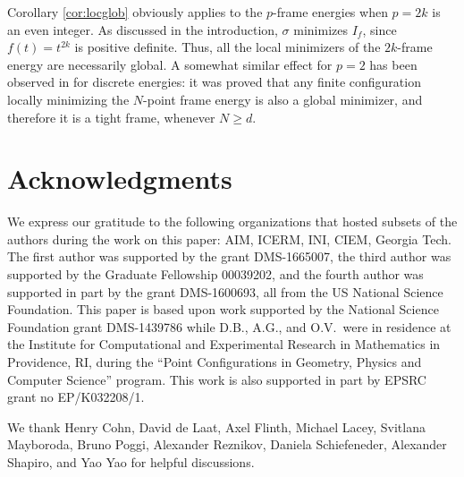 \documentclass[11pt, leqno]{amsart}
\theoremstyle{definition}
\numberwithin{equation}{section}
\begin{document}
Corollary \ref{cor:locglob} obviously applies to the $p$-frame energies  when $p= 2k$ is an even integer.    As discussed in the introduction,  $\sigma$  minimizes $I_f$, since $f(t) = t^{2k}$ is positive definite. Thus, all the local minimizers of the $2k$-frame energy are necessarily global. A somewhat  similar effect for $p=2$  has been observed  in \cite{benedetto2003finite} for discrete energies: it was proved that any finite configuration locally minimizing the $N$-point frame energy is also a global minimizer, and therefore it is a tight frame, whenever $N\geq d$. 







\section{Acknowledgments}\label{sec:acknow}

We express our gratitude to the  following organizations that  hosted subsets of
the authors during the work on this paper: AIM, ICERM, INI, CIEM, Georgia Tech.
The first author was supported by the  grant DMS-1665007, the third author was
supported by the Graduate Fellowship 00039202,  and the fourth author was
supported in part by the grant DMS-1600693, all from the US National Science
Foundation. This paper is based upon work supported by the National Science Foundation
grant DMS-1439786 while D.B., A.G., and O.V.\ were in residence at the Institute
for Computational and Experimental Research in Mathematics in Providence, RI,
during the ``Point Configurations in Geometry, Physics and Computer Science''
program. This work is also supported in part by EPSRC grant no EP/K032208/1.  

We thank Henry Cohn, David de Laat, Axel Flinth, Michael Lacey, Svitlana Mayboroda, Bruno Poggi, Alexander Reznikov, Daniela Schiefeneder, Alexander Shapiro, and Yao Yao for helpful discussions.  
\end{document}
